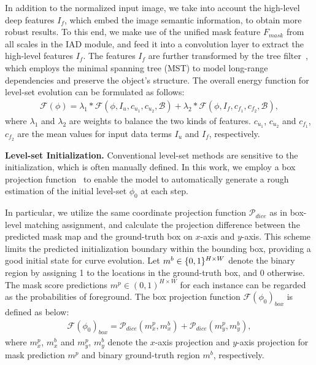 \documentclass[12pt,onecolumn,letterpaper]{article}
\begin{document}
In addition to the normalized input image, we take into account the high-level deep features $I_f$, which embed the image semantic information, to obtain more robust results. To this end, we make use of the unified mask feature $F_{mask}$ from all scales in the IAD module, and feed it into a convolution layer to extract the high-level features $I_f$. 
The features $I_f$ are further transformed by the tree filter~\cite{nips2019learnable, liang2022tree}, which employs the minimal spanning tree (MST) to model long-range dependencies and preserve the object's structure. 
The overall energy function for level-set evolution can be formulated as follows:
\begin{equation} \label{eq8}
	\begin{aligned}
		\mathcal{F(\phi)}\! =\! \lambda_1\! * \! {\mathcal{F}}(\phi,\! I_u,\! c_{{u_1}},\! c_{{u_2}},\! \mathcal{B}) \! +\! \lambda_2 *  {\mathcal{F}}(\phi,\! I_f, \! c_{{f_1}}, \! c_{{f_2}},\! \mathcal{B}),
	\end{aligned}
\end{equation}
where $\lambda_1$ and $\lambda_2$ are weights to balance the two kinds of features. $c_{{u_1}}$, $c_{{u_2}}$ and $c_{{f_1}}$, $c_{{f_2}}$ are the mean values for input data terms $I_u$ and $I_f$, respectively.

\textbf{Level-set Initialization.} Conventional level-set methods are sensitive to the initialization, which is often manually defined. In this work, we employ a box projection function~\cite{cvpr2021_boxinst} to enable the model to automatically generate a rough estimation of the initial level-set $\phi_0$ at each step.

In particular, we utilize the same coordinate projection function $\mathcal{P}_{{dice}}$ as in box-level matching assignment, and calculate the projection difference between the predicted mask map and the ground-truth box on $x$-axis and $y$-axis. 
This scheme limits the predicted initialization boundary within the bounding box, providing a good initial state for curve evolution. 
Let $m^b \in {\{ 0,1\} ^{H \times W}}{\rm{ }}$ denote the binary region by assigning 1 to the locations in the ground-truth box, and 0 otherwise. The mask score predictions ${m^p} \in {(0,1)^{H \times W}}$ for each instance can be regarded as the probabilities of foreground. The box projection function ${\mathcal{F}(\phi_0)_{box}}$ is defined as below:
\begin{equation} \label{eqbox}
	\begin{aligned}
		{\mathcal{F}(\phi_0)_{box}} = \mathcal{P}_{dice}({m^p_x},{m^b_x}) + \mathcal{P}_{dice}({m^p_y},{m^b_y}),
	\end{aligned}
\end{equation}
where ${m^p_x}$, $m^b_x$ and ${m^p_y}$, $m^b_y$ denote the $x$-axis projection and $y$-axis projection for mask prediction $m^p$ and binary ground-truth region $m^b$, respectively. 
\end{document}
